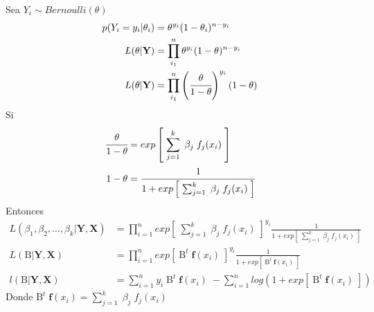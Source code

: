 \documentclass[12pt,a4paper,oneside]{report}
\begin{document}
\newpage

Sea $Y_i \sim Bernoulli(\theta)$
\begin{align*}
p(Y_i=y_i|\theta_i) &= \theta^{y_i} (1-\theta_i)^{n-y_i} \\
L(\theta|\textbf{Y}) &= \prod_{i_1}^n \theta^{y_i} (1-\theta)^{n-y_i} \\
L(\theta|\textbf{Y}) &= \prod_{i_1}^n \left(\cfrac{\theta}{1-\theta}\right) ^{y_i} (1-\theta)
\end{align*}
Si
\begin{align*}
\cfrac{\theta}{1-\theta} &= exp\left[ \; \sum_{j=1}^k \; \beta_j \;  f_j( x_{i} ) \;\right] \\
1-\theta &= \cfrac{1}{1+exp\left[ \; \sum_{j=1}^k \; \beta_j \;  f_j( x_{i} ) \;\right]}
\end{align*}
Entonces
\begin{align*}
L(\beta_1, \beta_2, \dots, \beta_k|\textbf{Y},\textbf{X}) &= \prod_{i=1}^n exp\left[ \;  \sum_{j=1}^k \; \beta_j \; f_j( x_{i} ) \;\right] ^ {y_i} \frac{1}{1+exp\left[ \; \sum_{j=1}^k \; \beta_j \; f_j( x_{i} ) \;\right]} \\
L(\mathrm{B}|\textbf{Y},\textbf{X}) &= \prod_{i=1}^n exp\left[ \;  \mathrm{B}^t \; \textbf{f}( x_{i} ) \;\right] ^ {y_i} \frac{1}{1+exp\left[ \;\mathrm{B}^t \; \textbf{f}( x_{i} ) \;\right]} \\
l(\mathrm{B}|\textbf{Y},\textbf{X}) &= \sum_{i=1}^n {y_i} \; \mathrm{B}^t \; \textbf{f}( x_{i} ) \; - \sum_{i=1}^n log \left( 1+exp\left[ \; \mathrm{B}^t \; \textbf{f}( x_{i} ) \;\right] \right)
\end{align*}
Donde $\mathrm{B}^t \; \textbf{f}( x_{i} ) =\sum_{j=1}^k \; \beta_j \; f_j( x_{i} )$


\newpage
\end{document}
